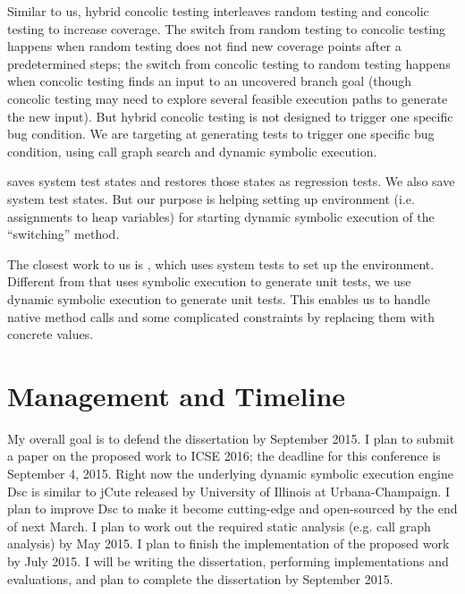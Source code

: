 \documentclass[proposal]{umthesis} %
\begin{document}
Similar to us, hybrid concolic testing\cite{Majumdar:2007:HCT:1248820.1248874} interleaves random testing and concolic testing to increase coverage.  The switch from random testing to concolic testing happens when random testing does not find new coverage points after a predetermined steps; the switch from concolic testing to random testing happens when concolic testing finds an input to an uncovered branch goal (though concolic testing may need to explore several feasible execution paths to generate the new input).  But hybrid concolic testing is not designed to trigger one specific bug condition.  We are targeting at generating tests to trigger one specific bug condition, using call graph search and dynamic symbolic execution. 

\cite{Elbaum:2006:CDU:1181775.1181806} saves system test states and restores those states as regression tests.  We also save system test states.  But our purpose is helping setting up environment (i.e. assignments to heap variables) for starting dynamic symbolic execution of the “switching” method.

The closest work to us is \cite{Pasareanu:2008:CUS:1390630.1390635}, which uses system tests to set up the environment.  Different from\cite{Pasareanu:2008:CUS:1390630.1390635} that uses symbolic execution to generate unit tests, we use dynamic symbolic execution to generate unit tests.  This enables us to handle native method calls and some complicated constraints by replacing them with concrete values. 

\chapter{Management and Timeline}
\label{chp:timeline}

My overall goal is to defend the dissertation by September 2015.  I plan to submit a paper on the proposed work to ICSE 2016; the deadline for this conference is September 4, 2015.  Right now the underlying dynamic symbolic execution engine Dsc\cite{islam10dsc+mock} is similar to jCute\cite{sen06cute} released by University of Illinois at Urbana-Champaign. I plan to improve Dsc to make it become cutting-edge and open-sourced by the end of next March.  I plan to work out the required static analysis (e.g. call graph analysis) by May 2015.  I plan to finish the implementation of the proposed work by July 2015.  I will be writing the dissertation, performing implementations and evaluations, and plan to complete the dissertation by September 2015. 






\medskip

\end{document}
